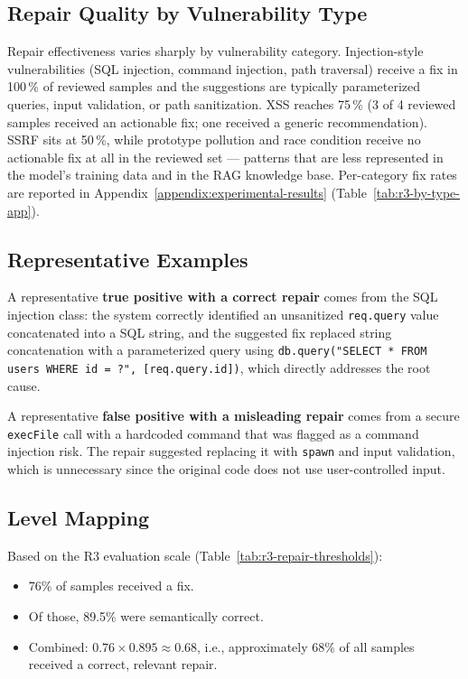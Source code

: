\subsection{Repair Quality by Vulnerability Type}

Repair effectiveness varies sharply by vulnerability category. Injection-style vulnerabilities (SQL injection, command injection, path traversal) receive a fix in 100\,\% of reviewed samples and the suggestions are typically parameterized queries, input validation, or path sanitization. XSS reaches 75\,\% (3 of 4 reviewed samples received an actionable fix; one received a generic recommendation). SSRF sits at 50\,\%, while prototype pollution and race condition receive no actionable fix at all in the reviewed set --- patterns that are less represented in the model's training data and in the RAG knowledge base. Per-category fix rates are reported in Appendix~\ref{appendix:experimental-results} (Table~\ref{tab:r3-by-type-app}).

\subsection{Representative Examples}

A representative \textbf{true positive with a correct repair} comes from the SQL injection class: the system correctly identified an unsanitized \texttt{req.query} value concatenated into a SQL string, and the suggested fix replaced string concatenation with a parameterized query using \texttt{db.query("SELECT * FROM users WHERE id = ?", [req.query.id])}, which directly addresses the root cause.

A representative \textbf{false positive with a misleading repair} comes from a secure \texttt{execFile} call with a hardcoded command that was flagged as a command injection risk. The repair suggested replacing it with \texttt{spawn} and input validation, which is unnecessary since the original code does not use user-controlled input.

\subsection{Level Mapping}

Based on the R3 evaluation scale (Table~\ref{tab:r3-repair-thresholds}):

\begin{itemize}
  \item 76\% of samples received a fix.
  \item Of those, 89.5\% were semantically correct.
  \item Combined: $0.76 \times 0.895 \approx 0.68$, i.e., approximately 68\% of all samples received a correct, relevant repair.
\end{itemize}

